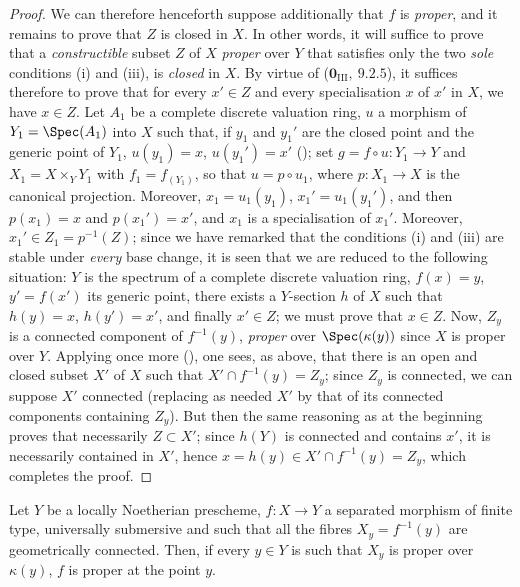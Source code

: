 \begin{proof}
We can therefore henceforth suppose additionally that $f$ is \emph{proper}, and it remains to prove that $Z$ is closed in $X$.
In other words, it will suffice to prove that a \emph{constructible} subset $Z$ of $X$ \emph{proper} over $Y$ that satisfies only the two \emph{sole} conditions (i) and (iii), is \emph{closed} in $X$.
By virtue of ($\mathbf{0}_{\mathrm{III}},~9.2.5$), it suffices therefore to prove that for every $x'\in Z$ and every specialisation $x$ of $x'$ in $X$, we have $x\in Z$.
Let $A_1$ be a complete discrete valuation ring, $u$ a morphism of $Y_1=\Spec(A_1)$ into $X$ such that, if $y_1$ and $y_1'$ are the closed point and the generic point of $Y_1$, $u(y_1)=x$, $u(y_1')=x'$ (); set $g=f\circ u:Y_1\to Y$ and $X_1=X\times_Y Y_1$ with $f_1=f_{(Y_1)}$, so that $u=p\circ u_1$, where $p:X_1\to X$ is the canonical projection.
Moreover, $x_1=u_1(y_1)$, $x_1'=u_1(y_1')$, and then $p(x_1)=x$ and $p(x_1')=x'$, and $x_1$ is a specialisation of $x_1'$.
Moreover, $x_1'\in Z_1=p^{-1}(Z)$; since we have remarked that the conditions (i) and (iii) are stable under \emph{every} base change, it is seen that we are reduced to the following situation: $Y$ is the spectrum of a complete discrete valuation ring, $f(x)=y$, $y'=f(x')$ its generic point, there exists a $Y$-section $h$ of $X$ such that $h(y)=x$, $h(y')=x'$, and finally $x'\in Z$; we must prove that $x\in Z$.
Now, $Z_y$ is a connected component of $f^{-1}(y)$, \emph{proper} over $\Spec(\kappa(y))$ since $X$ is proper over $Y$.
Applying once more (), one sees, as above, that there is an open and closed subset $X'$ of $X$ such that $X'\cap f^{-1}(y)=Z_y$; since $Z_y$ is connected,
we can suppose $X'$ connected (replacing as needed $X'$ by that of its connected components containing $Z_y$).
But then the same reasoning as at the beginning proves that necessarily $Z\subset X'$; since $h(Y)$ is connected and contains $x'$, it is necessarily contained in $X'$, hence $x=h(y)\in X'\cap f^{-1}(y)=Z_y$, which completes the proof.
\end{proof}

\begin{corollary}[15.7.10]
\label{IV.15.7.10}
Let $Y$ be a locally Noetherian prescheme, $f:X\to Y$ a separated morphism of finite type, universally submersive  and such that all the fibres $X_y=f^{-1}(y)$ are geometrically connected.
Then, if every $y\in Y$ is such that $X_y$ is proper over $\kappa(y)$, $f$ is proper at the point $y$.
\end{corollary}

